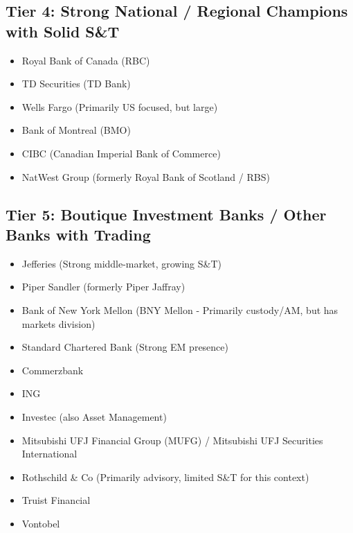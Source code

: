 \documentclass[11pt,a4paper]{article}
\begin{document}
\subsection*{Tier 4: Strong National / Regional Champions with Solid S\&T}
\begin{multicols}{3}
\begin{itemize}[label=\textbullet, leftmargin=*, itemsep=1pt, parsep=0pt]
    \item Royal Bank of Canada (RBC)
    \item TD Securities (TD Bank)
    \item Wells Fargo (Primarily US focused, but large)
    \item Bank of Montreal (BMO)
    \item CIBC (Canadian Imperial Bank of Commerce)
    \item NatWest Group (formerly Royal Bank of Scotland / RBS)
\end{itemize}
\end{multicols}

\subsection*{Tier 5: Boutique Investment Banks / Other Banks with Trading}
\begin{multicols}{3}
\begin{itemize}[label=\textbullet, leftmargin=*, itemsep=1pt, parsep=0pt]
    \item Jefferies (Strong middle-market, growing S\&T)
    \item Piper Sandler (formerly Piper Jaffray)
    \item Bank of New York Mellon (BNY Mellon - Primarily custody/AM, but has markets division)
    \item Standard Chartered Bank (Strong EM presence)
    \item Commerzbank
    \item ING
    \item Investec (also Asset Management)
    \item Mitsubishi UFJ Financial Group (MUFG) / Mitsubishi UFJ Securities International
    \item Rothschild \& Co (Primarily advisory, limited S\&T for this context)
    \item Truist Financial
    \item Vontobel
\end{itemize}
\end{multicols}
\end{document}
